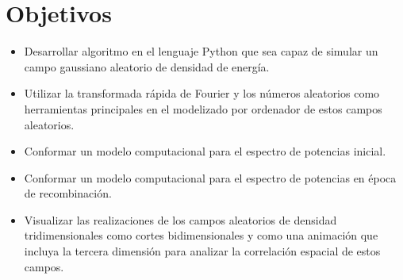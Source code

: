 \chapter{Objetivos}
\begin{itemize}
    \item Desarrollar algoritmo en el lenguaje Python que sea capaz de simular un campo gaussiano aleatorio de densidad de energía.
    \item Utilizar la transformada rápida de Fourier y los números aleatorios como herramientas principales en el modelizado por ordenador de estos campos aleatorios.
    \item Conformar un modelo computacional para el espectro de potencias inicial.
    \item Conformar un modelo computacional para el espectro de potencias en época de recombinación.
    \item Visualizar las realizaciones de los campos aleatorios de densidad tridimensionales como cortes bidimensionales y como una animación que incluya la tercera dimensión para analizar la correlación espacial de estos campos.
\end{itemize}